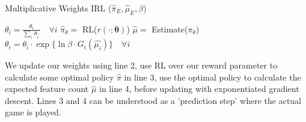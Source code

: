 \documentclass[11pt]{article}
\begin{document}
\begin{algorithm}[H]
    \label{algo:mw_irl}
    \caption{Multiplicative Weights IRL ($\hat{\pi}_E, \hat{\mu}_E, \beta$)}
    \begin{algorithmic}[1]
    \State $\theta_i = \frac{\theta_i}{\sum_{i^{'}} \theta_{i^{'}}} \quad \forall i$
    \State $\hat{\pi}_\theta = $ RL($r(\cdot; \boldsymbol{\theta})$)
    \State $\hat{\mu} = $ Estimate($\pi_\theta$)
    \State $\theta_i = \theta_i \cdot \exp{\{\ln{\beta \cdot G_i(\hat{\mu_i})}\}} \quad \forall i$
    \EndFor \\
    \end{algorithmic}
\end{algorithm}

We update our weights using line 2, use RL over our reward parameter to calculate some optimal policy $\hat{\pi}$ in line 3, use the optimal policy to calculate the expected feature count $\hat{\mu}$ in line 4, before updating with exponentiated gradient descent. Lines 3 and 4 can be understood as a 'prediction step' where the actual game is played.

{


}

\end{document}
